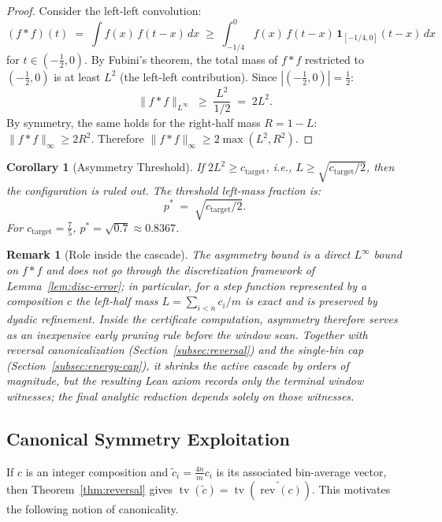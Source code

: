 \documentclass[11pt, letterpaper]{article}
\theoremstyle{paperplain}
\newtheorem{corollary}[theorem]{Corollary}
\theoremstyle{paperdef}
\newtheorem{remark}[theorem]{Remark}
\newcommand{\tv}{\operatorname{tv}}
\newcommand{\rev}{\operatorname{rev}}
\begin{document}
\begin{proof}
Consider the left-left convolution:
\[
  (f * f)(t) \;=\; \int f(x)\, f(t-x)\, dx
  \;\ge\; \int_{-1/4}^{0} f(x)\, f(t-x)\, \mathbf{1}_{[-1/4,0]}(t-x)\, dx
\]
for $t \in (-\tfrac12, 0)$.  By Fubini's theorem, the total mass of
$f * f$ restricted to $(-\tfrac12, 0)$ is at least $L^2$ (the
left-left contribution).  Since $|(-\tfrac12, 0)| = \tfrac12$:
\[
  \|f * f\|_{L^\infty} \;\ge\; \frac{L^2}{1/2} \;=\; 2L^2.
\]
By symmetry, the same holds for the right-half mass $R = 1 - L$:
$\|f*f\|_\infty \ge 2R^2$.  Therefore
$\|f*f\|_\infty \ge 2 \max(L^2, R^2)$.
\end{proof}

\begin{corollary}[Asymmetry Threshold]
\label{cor:asym-threshold}
If $2L^2 \ge c_{\mathrm{target}}$, i.e.,
$L \ge \sqrt{c_{\mathrm{target}}/2}$, then the configuration is
ruled out.  The threshold left-mass fraction is:
\[
  p^* \;=\; \sqrt{c_{\mathrm{target}} / 2}.
\]
For $c_{\mathrm{target}} = \tfrac{7}{5}$, $p^* = \sqrt{0.7} \approx 0.8367$.
\end{corollary}

\begin{remark}[Role inside the cascade]
The asymmetry bound is a \emph{direct} $L^\infty$ bound on $f*f$ and
does not go through the discretization framework of
Lemma~\ref{lem:disc-error}; in particular, for a step function
represented by a composition $c$ the left-half mass
$L = \sum_{i<n} c_i/m$ is exact and is preserved by dyadic
refinement.  Inside the certificate computation, asymmetry therefore
serves as an inexpensive early pruning rule before the window scan.
Together with reversal canonicalization (Section~\ref{subsec:reversal})
and the single-bin cap (Section~\ref{subsec:energy-cap}), it shrinks
the active cascade by orders of magnitude, but the resulting Lean
axiom records only the terminal window witnesses; the final analytic
reduction depends solely on those witnesses.
\end{remark}

\subsection{Canonical Symmetry Exploitation}

If $c$ is an integer composition and
$\tilde c_i = \tfrac{4n}{m}c_i$ is its associated bin-average vector,
then Theorem~\ref{thm:reversal} gives
$\tv(\tilde c) = \tv(\widetilde{\rev(c)})$.  This motivates the
following notion of canonicality.
\end{document}
